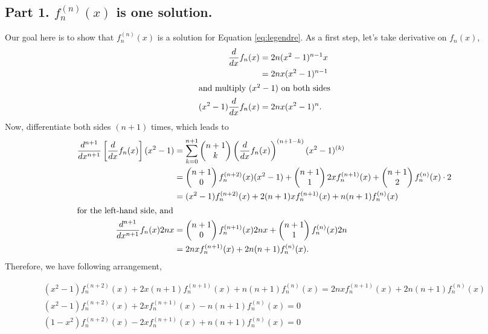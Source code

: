 \documentclass[fontsize=12pt]{article}
\begin{document}
\subsection*{Part 1. $f_n^{(n)} (x)$ is one solution.}
Our goal here is to show that $f_n^{(n)}(x)$ is a solution for Equation \eqref{eq:legendre}. As a first step, let's take derivative on $f_n (x)$,
\begin{align*}
\frac{d}{dx} f_n (x) &= 2 n (x^2  - 1)^{n-1} x \\
&= 2nx (x^2 - 1)^{n-1} \\
\intertext{and multiply $(x^2 - 1)$ on both sides}
(x^2 - 1) \frac{d}{dx} f_n (x)  &= 2nx (x^2 - 1)^n.
\end{align*}
Now, differentiate both sides $(n+1)$ times, which leads to 
\begin{align*}
\frac{d^{n+1}}{dx^{n+1}} \left[ \frac{d}{dx} f_n (x) \right]  (x^2 -1) 
&= \sum_{k=0}^{n+1}
\begin{pmatrix}
n+1 \\ k
\end{pmatrix}
\left( \frac{d}{dx} f_n (x) \right)^{(n+1-k)} (x^2-1)^{(k)} \\
&= 
\begin{pmatrix}
n+1 \\ 0
\end{pmatrix}
f_n^{(n+2)} (x) (x^2-1) + 
\begin{pmatrix}
n+1 \\ 1
\end{pmatrix}
2x f_n^{(n+1)}  (x) +
\begin{pmatrix}
n+1 \\ 2
\end{pmatrix}
f_n ^{(n)} (x) \cdot 2 \\
&= (x^2-1) f_n^{(n+2)} (x) + 2(n+1)x f_n^{(n+1)} (x) + 
n(n+1) f_n^{(n)} (x) \\
\intertext{for the left-hand side, and}
\frac{d^{n+1}}{dx^{n+1}} f_n(x) 2nx &=
\begin{pmatrix}
n+1 \\ 0
\end{pmatrix} 
f_n^{(n+1)} (x) 2nx + 
\begin{pmatrix}
n+1 \\ 1
\end{pmatrix}
f_n^{(n)} (x) 2n \\
&= 2nx f_n^{(n+1)} (x) + 2n(n+1)f_n^{(n)}(x). 
\end{align*}
Therefore, we have following arrangement,

\begin{equation*}
	\begin{gathered}
	(x^2 - 1) f_n^{(n+2)} (x) + 2x(n+1)f_n^{(n+1)} (x) + n(n+1)f_n^{(n)} (x) = 
	2nx f_n^{(n+1)} (x) + 2n(n+1) f_n^{(n)} (x) \\
	(x^2-1) f_n^{(n+2)} (x) + 2x f_n^{(n+1)}(x) - n(n+1)f_n^{(n)} (x) = 0 \\
	(1- x^2) f_n^{(n+2)} (x) - 2x f_n^{(n+1)}(x) + n(n+1)f_n^{(n)} (x) = 0
	\end{gathered}
\end{equation*}
\end{document}
